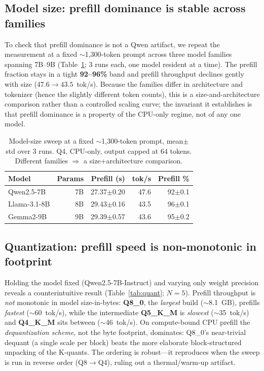 \documentclass[sigconf,nonacm,10pt]{acmart}
\begin{document}
\subsection{Model size: prefill dominance is stable across families}
\label{sec:results-size}
To check that prefill dominance is not a Qwen artifact, we repeat the
measurement at a fixed $\sim$1{,}300-token prompt across three model
families spanning 7B--9B (Table~\ref{tab:modelsize}; 3 runs each, one model
resident at a time). The prefill fraction stays in a tight
\textbf{92--96\%} band and prefill throughput declines gently with size
($47.6\rightarrow43.5$~tok/s). Because the families differ in architecture
and tokenizer (hence the slightly different token counts), this is a
size-and-architecture comparison rather than a controlled scaling curve;
the invariant it establishes is that prefill dominance is a property of the
CPU-only regime, not of any one model.

\begin{table}[t]
  \centering
  \caption{Model-size sweep at a fixed $\sim$1{,}300-token prompt,
  mean$\pm$std over 3 runs. Q4, CPU-only, output capped at 64 tokens.
  Different families $\Rightarrow$ a size+architecture comparison.}
  \label{tab:modelsize}
  \small
  \begin{tabular}{lrrrr}
    \toprule
    Model & Params & Prefill (s) & tok/s & Prefill \% \\
    \midrule
    Qwen2.5-7B   & 7B & 27.37$\pm$0.20 & 47.6 & 92$\pm$0.1 \\
    Llama-3.1-8B & 8B & 29.43$\pm$0.16 & 43.5 & 96$\pm$0.1 \\
    Gemma2-9B    & 9B & 29.39$\pm$0.57 & 43.6 & 95$\pm$0.2 \\
    \bottomrule
  \end{tabular}
\end{table}

\subsection{Quantization: prefill speed is non-monotonic in footprint}
\label{sec:results-quant}
Holding the model fixed (Qwen2.5-7B-Instruct) and varying only weight
precision reveals a counterintuitive result (Table~\ref{tab:quant};
$N{=}5$). Prefill throughput is \emph{not} monotonic in model
size-in-bytes: \textbf{Q8\_0}, the \emph{largest} build ($\sim$8.1~GB),
prefills \emph{fastest} ($\sim$60~tok/s), while the intermediate
\textbf{Q5\_K\_M} is \emph{slowest} ($\sim$35~tok/s) and \textbf{Q4\_K\_M}
sits between ($\sim$46~tok/s). On compute-bound CPU prefill the
\emph{dequantization scheme}, not the byte footprint, dominates: Q8\_0's
near-trivial dequant (a single scale per block) beats the more elaborate
block-structured unpacking of the K-quants. The ordering is robust---it
reproduces when the sweep is run in reverse order (Q8${\to}$Q4), ruling out
a thermal/warm-up artifact.
\end{document}
